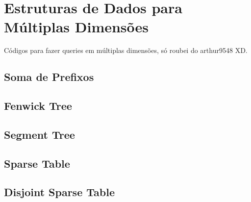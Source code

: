 \section{Estruturas de Dados para Múltiplas Dimensões}
Códigos para fazer queries em múltiplas dimensões, só roubei do arthur9548 XD.

\subsection{Soma de Prefixos}

\subsection{Fenwick Tree}

\subsection{Segment Tree}

\subsection{Sparse Table}

\subsection{Disjoint Sparse Table}
